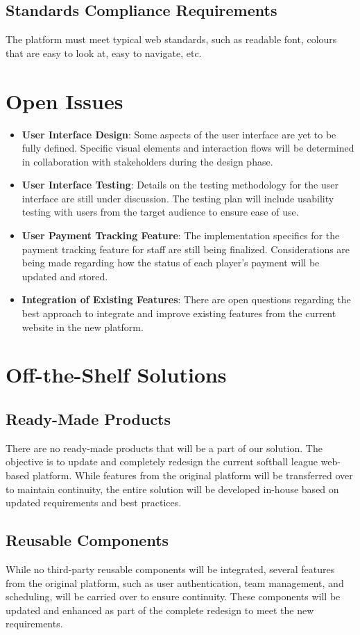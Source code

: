 \documentclass[12pt]{article}
\begin{document}
\subsection{Standards Compliance Requirements}
The platform must meet typical web standards, such as readable font, colours that are easy to look at, easy to navigate, etc.

\section{Open Issues}
\begin{itemize}
    \item \textbf{User Interface Design}: Some aspects of the user interface are yet to be fully defined. Specific visual elements and interaction flows will be determined in collaboration with stakeholders during the design phase.
    \item \textbf{User Interface Testing}: Details on the testing methodology for the user interface are still under discussion. The testing plan will include usability testing with users from the target audience to ensure ease of use.
    \item \textbf{User Payment Tracking Feature}: The implementation specifics for the payment tracking feature for staff are still being finalized. Considerations are being made regarding how the status of each player's payment will be updated and stored.
    \item \textbf{Integration of Existing Features}: There are open questions regarding the best approach to integrate and improve existing features from the current website in the new platform.
\end{itemize}

\section{Off-the-Shelf Solutions}
\subsection{Ready-Made Products}
There are no ready-made products that will be a part of our solution. The objective is to update and completely redesign the current softball league web-based platform. While features from the original platform will be transferred over to maintain continuity, the entire solution will be developed in-house based on updated requirements and best practices.

\subsection{Reusable Components}
While no third-party reusable components will be integrated, several features from the original platform, such as user authentication, team management, and scheduling, will be carried over to ensure continuity. These components will be updated and enhanced as part of the complete redesign to meet the new requirements.
\end{document}
